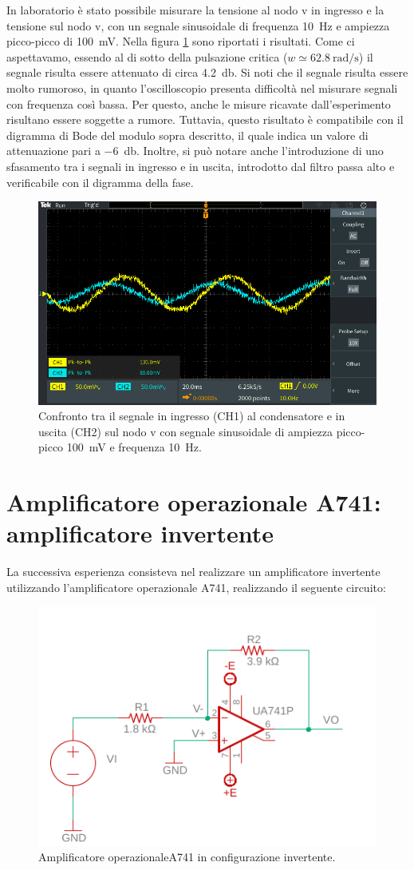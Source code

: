 In laboratorio è stato possibile misurare la tensione al nodo v in ingresso e la tensione sul nodo v, con un segnale sinusoidale di frequenza \SI{10}{\hertz} e ampiezza picco-picco di \SI{100}{\milli\volt}. Nella figura \ref{fig:hpf_10hz} sono riportati i risultati. Come ci aspettavamo, essendo al di sotto della pulsazione critica ($w\simeq\SI{62.8}{\radian/\second}$) il segnale risulta essere attenuato di circa \SI{4.2}{\decibel}. Si noti che il segnale risulta essere molto rumoroso, in quanto l'oscilloscopio presenta difficoltà nel misurare segnali con frequenza così bassa. Per questo, anche le misure ricavate dall'esperimento risultano essere soggette a rumore. Tuttavia, questo risultato è compatibile con il digramma di Bode del modulo sopra descritto, il quale indica un valore di attenuazione pari a \SI{-6}{\decibel}. Inoltre, si può notare anche l'introduzione di uno sfasamento tra i segnali in ingresso e in uscita, introdotto dal filtro passa alto e verificabile con il digramma della fase.
\begin{figure}[h!]
	\centering
	\includegraphics[width=0.6\linewidth]{./ImageFiles/Laboratorio 4/TEK00003}
	\caption{Confronto tra il segnale in ingresso (CH1) al condensatore e in uscita (CH2) sul nodo v con segnale sinusoidale di ampiezza picco-picco \SI{100}{\milli\volt} e frequenza \SI{10}{\hertz}.}
	\label{fig:hpf_10hz}
\end{figure}

\section{Amplificatore operazionale \textmu A741: amplificatore invertente}
La successiva esperienza consisteva nel realizzare un amplificatore invertente utilizzando l'amplificatore operazionale \textmu A741, realizzando il seguente circuito:
\begin{figure}[h!]
	\centering
	\includegraphics[width=0.6\linewidth]{./OtherFiles/Laboratorio 4/opam_inv}
	\caption{Amplificatore operazionale\textmu A741 in configurazione invertente.}
	\label{fig:opamp_inv}
\end{figure}

